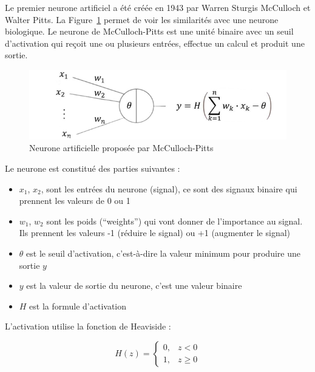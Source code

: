 \par{Le premier neurone artificiel \cite{mcculloch_logical_1943} a été créée en 1943 par Warren Sturgis McCulloch et Walter Pitts. La Figure~\ref{fig:A1_03_neurone_artificielle_mcculloch} permet de voir les similarités avec une neurone biologique. Le neurone de McCulloch-Pitts est une unité binaire avec un seuil d'activation qui reçoit une ou plusieurs entrées, effectue un calcul et produit une sortie.}

\begin{figure}
    \centering
    \includegraphics[width=1\linewidth]{03-tail//A1_fondamentaux_ML//A1_figures/A1_03_neurone_artificielle_mcculloch.png}
    \caption{Neurone artificielle proposée par McCulloch-Pitts \cite{zahn_cours_2024}}
    \label{fig:A1_03_neurone_artificielle_mcculloch}
\end{figure}

\par{Le neurone est constitué des parties suivantes :}
\begin{itemize}
    \item $x_1$, $x_2$, sont les entrées du neurone (signal), ce sont des signaux binaire qui prennent les valeurs de 0 ou 1
    \item $w_1$, $w_2$ sont les poids (``weights'') qui vont donner de l'importance au signal. Ils prennent les valeurs -1 (réduire le signal) ou +1 (augmenter le signal)
    \item $\theta$ est le seuil d'activation, c'est-à-dire la valeur minimum pour produire une sortie $y$
    \item $y$ est la valeur de sortie du neurone, c'est une valeur binaire
    \item $H$ est la formule d'activation
\end{itemize}

\par{L'activation utilise la fonction de Heaviside :}

\begin{equation}
    H(z) = 
    \begin{cases}
        0, & z < 0 \\
        1, & z \geq 0
    \end{cases}
    \label{eq:heaviside}
\end{equation}

